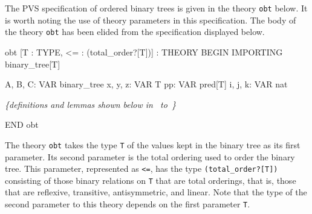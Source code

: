 \documentclass[11pt,twoside]{book}
\newcommand{\pvsref}[1]{\fbox{\footnotesize\ref{#1}}} \def\id#1{\hbox{\textt{#1}}} %
\begin{document}
The  PVS specification of ordered binary trees is given in the theory
\texttt{obt} below.  It is worth noting the use of theory parameters in
this specification.   The body of the theory \texttt{obt} has been elided
from the specification displayed below.
\begin{session*}
obt [T : TYPE,  <= : (total_order?[T])] : THEORY
BEGIN
IMPORTING binary_tree[T]

A, B, C: VAR binary_tree
x, y, z: VAR T
pp: VAR pred[T]
i, j, k: VAR nat

\emph{\{definitions and lemmas shown below in~\pvsref{size} to~\pvsref{ordered?_insert}\}}

END obt
\end{session*}
The theory \texttt{obt} takes the type \texttt{T} of the values kept in the
binary tree as its first parameter.   Its  second parameter 
is the total ordering used to order the binary tree.  This parameter,
represented as \texttt{<=}, has the type \texttt{(total\_order?[T])} 
consisting of those binary relations on \texttt{T} that are total
orderings, that is, those that are reflexive, transitive, antisymmetric, and
linear.  Note that the type of the second parameter to this theory depends on
the first parameter \texttt{T}\@.  

\end{document}
